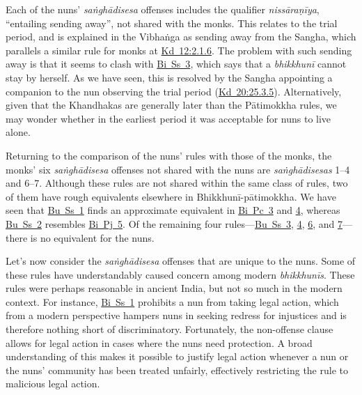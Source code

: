 \documentclass[12pt,openany]{book}%
\begin{document}
Each of the nuns’ \textit{\textsanskrit{saṅghādisesa}} offenses includes the qualifier \textit{\textsanskrit{nissāraṇīya}}, “entailing sending away”, not shared with the monks. This relates to the trial period, and is explained in the \textsanskrit{Vibhaṅga} as sending away from the Sangha, which parallels a similar rule for monks at \href{https://suttacentral.net/pli-tv-kd12/en/brahmali\#2.1.6}{Kd~12:2.1.6}. The problem with such sending away is that it seems to clash with \href{https://suttacentral.net/pli-tv-bi-vb-ss3/en/brahmali\#4.14.1}{Bi~Ss~3}, which says that a \textit{\textsanskrit{bhikkhunī}} cannot stay by herself. As we have seen, this is resolved by the Sangha appointing a companion to the nun observing the trial period (\href{https://suttacentral.net/pli-tv-kd20/en/brahmali\#25.3.5}{Kd~20:25.3.5}). Alternatively, given that the Khandhakas are generally later than the \textsanskrit{Pātimokkha} rules, we may wonder whether in the earliest period it was acceptable for nuns to live alone.

Returning to the comparison of the nuns’ rules with those of the monks, the monks’ six \textit{\textsanskrit{saṅghādisesa}} offenses not shared with the nuns are \textit{\textsanskrit{saṅghādisesas}} 1–4 and 6–7. Although these rules are not shared within the same class of rules, two of them have rough equivalents elsewhere in \textsanskrit{Bhikkhunī}-\textsanskrit{pātimokkha}. We have seen that \href{https://suttacentral.net/pli-tv-bu-vb-ss1/en/brahmali\#2.1.13.1}{Bu~Ss~1} finds an approximate equivalent in \href{https://suttacentral.net/pli-tv-bi-vb-pc3/en/brahmali\#1.14.1}{Bi~Pc~3} and \href{https://suttacentral.net/pli-tv-bi-vb-pc4/en/brahmali\#1.21.1}{4}, whereas \href{https://suttacentral.net/pli-tv-bu-vb-ss2/en/brahmali\#1.2.15.1}{Bu~Ss~2} resembles \href{https://suttacentral.net/pli-tv-bi-vb-pj5/en/brahmali\#1.54.1}{Bi~Pj~5}. Of the remaining four rules—\href{https://suttacentral.net/pli-tv-bu-vb-ss3/en/brahmali\#1.2.14.1}{Bu~Ss~3}, \href{https://suttacentral.net/pli-tv-bu-vb-ss4/en/brahmali\#1.2.19.1}{4}, \href{https://suttacentral.net/pli-tv-bu-vb-ss6/en/brahmali\#1.6.6.1}{6}, and \href{https://suttacentral.net/pli-tv-bu-vb-ss7/en/brahmali\#1.19.1}{7}—there is no equivalent for the nuns.

Let’s now consider the \textit{\textsanskrit{saṅghādisesa}} offenses that are unique to the nuns. Some of these rules have understandably caused concern among modern \textit{\textsanskrit{bhikkhunīs}}. These rules were perhaps reasonable in ancient India, but not so much in the modern context. For instance, \href{https://suttacentral.net/pli-tv-bi-vb-ss1/en/brahmali\#1.56.1}{Bi~Ss~1} prohibits a nun from taking legal action, which from a modern perspective hampers nuns in seeking redress for injustices and is therefore nothing short of discriminatory. Fortunately, the non-offense clause allows for legal action in cases where the nuns need protection. A broad understanding of this makes it possible to justify legal action whenever a nun or the nuns’ community has been treated unfairly, effectively restricting the rule to malicious legal action.
\end{document}
